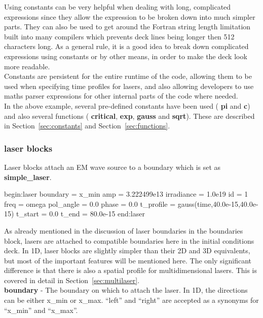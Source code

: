 \documentclass[12pt,a4paper]{article}
\newcommand{\emphtext}{\color{warwickdark} \fontfamily{phv}\selectfont\large\bf}
\newcommand{\sect}[1]{Section~\ref{sec:#1}}
\newcommand{\inlineemph}[1]{{\color{warwicklight} \bf{#1}}}
\newenvironment{lboxverbatim}[1]{
\setlength{\FrameSep}{0pt}
\def\FrameCommand{\fboxsep=0pt \colorbox{shadecolor}}
\MakeFramed{\FrameRestore}
\vspace{-13.5pt}
\fvset{label=#1}
\boxverb
}{
\endboxverb
\vspace{-13.5pt}
\endMakeFramed
}
\begin{document}
Using constants can be very helpful when dealing with long,
complicated expressions since they allow the expression to be broken down into
much simpler parts. They can also be used to get around the Fortran string
length limitation built into many compilers which prevents deck lines being
longer then 512 characters long. As a general rule, it is a good idea to break
down complicated expressions using constants or by other means, in order to
make the deck look more readable.\\

Constants are persistent for the entire runtime of the code,
allowing them to be used when specifying time profiles for lasers, and also
allowing developers to use maths parser expressions for other internal parts of
the code where needed.\\

In the above example, several pre-defined constants have been used
(\inlineemph{pi} and \inlineemph{c}) and also several functions
(\inlineemph{critical}, \inlineemph{exp}, \inlineemph{gauss} and
\inlineemph{sqrt}). These are described in \sect{constants} and
\sect{functions}.

\subsubsection{\inlineemph{laser} blocks}
\label{sec:lasers}
Laser blocks attach an EM wave source to a boundary which is set as
\inlineemph{simple\_laser}.

\begin{lboxverbatim}{laser block}
begin:laser
   boundary = x_min
   amp = 3.222499e13
   irradiance = 1.0e19
   id = 1
   freq = omega
   pol_angle = 0.0
   phase = 0.0
   t_profile = gauss(time,40.0e-15,40.0e-15)
   t_start = 0.0
   t_end = 80.0e-15
end:laser
\end{lboxverbatim}

As already mentioned in the discussion of laser boundaries in the boundaries
block, lasers are attached to compatible boundaries here in the initial
conditions deck. In 1D, laser blocks are slightly simpler than their 2D and 3D
equivalents, but most of the important features will be mentioned here. The
only significant difference is that there is also a spatial profile for
multidimensional lasers. This is covered in detail in
\sect{multilaser}.\\

{\emphtext boundary} - The boundary on which to attach the laser.
In 1D, the directions can be either x\_min or x\_max.  ``left'' and ``right''
are accepted as a synonyms for ``x\_min'' and ``x\_max''.\\
\end{document}
